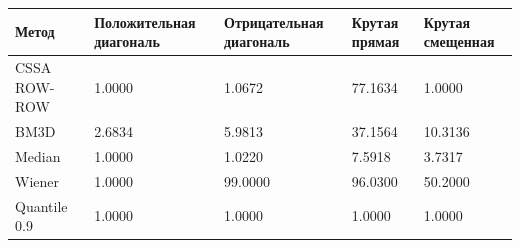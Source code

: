\begin{tabular}{|l|l|l|l|l|}
\hline
Метод & Положительная диагональ & Отрицательная диагональ & Крутая прямая & Крутая смещенная \\
\hline
CSSA ROW-ROW & 1.0000 & 1.0672 & 77.1634 & 1.0000 \\
\hline
BM3D & 2.6834 & 5.9813 & 37.1564 & 10.3136 \\
\hline
Median & 1.0000 & 1.0220 & 7.5918 & 3.7317 \\
\hline
Wiener & 1.0000 & 99.0000 & 96.0300 & 50.2000 \\
\hline
Quantile 0.9 & 1.0000 & 1.0000 & 1.0000 & 1.0000 \\
\hline
\end{tabular}

